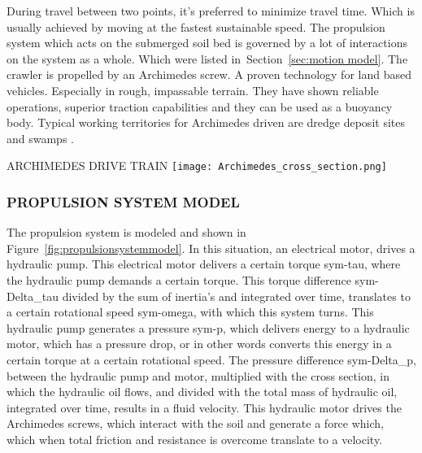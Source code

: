 During travel between two points, it's preferred to minimize travel time. Which is usually achieved by moving at the
fastest sustainable speed. The propulsion system which acts on the submerged soil bed is governed by a lot of
interactions on the system as a whole. Which were listed in~Section~\ref{sec:motion model}. The crawler is propelled by
an Archimedes screw. A proven technology for land based vehicles. Especially in rough, impassable terrain. They have
shown reliable operations, superior traction capabilities and they can be used as a buoyancy body. Typical working
territories for Archimedes driven are dredge deposit sites and swamps \citet{lotman_deep_2011}.

\begin{RoyalFigure}[!htb, label=fig:archimedes_drive_train]{ARCHIMEDES DRIVE TRAIN}
    \texttt{[image: Archimedes\_cross\_section.png]}
\end{RoyalFigure}

\subsubsection{PROPULSION SYSTEM MODEL}

The propulsion system is modeled and shown in Figure~\ref{fig:propulsionsystemmodel}. In this situation, an
electrical motor, drives a hydraulic pump. This electrical motor delivers a certain torque \gls{sym-tau}, where the
hydraulic pump demands a certain torque. This torque difference \gls{sym-Delta_tau} divided by the sum of inertia's and
integrated over time, translates to a certain rotational speed \gls{sym-omega}, with which this system turns. This
hydraulic pump generates a pressure \gls{sym-p}, which delivers energy to a hydraulic motor, which has a pressure drop,
or in other words converts this energy in a certain torque at a certain rotational speed. The pressure difference
\gls{sym-Delta_p}, between the hydraulic pump and motor, multiplied with the cross section, in which the hydraulic oil
flows, and divided with the total mass of hydraulic oil, integrated over time, results in a fluid velocity. This
hydraulic motor drives the Archimedes screws, which interact with the soil and generate a force which, which when total
friction and resistance is overcome translate to a velocity.

